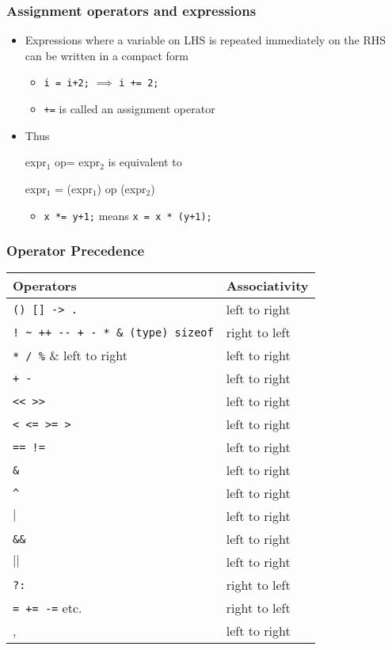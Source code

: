 \documentclass[11pt]{beamer}
\begin{document}
\begin{frame}[fragile]\frametitle{Assignment operators and expressions}
\label{sec-1-22}

\begin{itemize}
\item Expressions where a variable on LHS is repeated immediately on the RHS can be written in a compact form
\begin{itemize}
\item \verb~i = i+2;~ $\implies$ \verb~i += 2;~
\item \verb~+=~ is called an assignment operator
\end{itemize}
\item Thus

   expr$_1$ op= expr$_2$ is equivalent to
 
   expr$_1$ = (expr$_1$) op (expr$_2$)
\begin{itemize}
\item \verb~x *= y+1;~ means \verb~x = x * (y+1);~
\end{itemize}
\end{itemize}
\end{frame}
\begin{frame}[fragile]\frametitle{Operator Precedence}
\label{sec-1-23}



\begin{center}
\begin{tabular}{|p{7cm}|l|}
\hline
 Operators                               &  Associativity  \\
\hline
 \verb~() [] -> .~                       &  left to right  \\
 \verb,! ~ ++ -- + - * & (type) sizeof,  &  right to left  \\
 \verb~* / %~                            &  left to right  \\
 \verb~+ -~                              &  left to right  \\
 \verb~<< >>~                            &  left to right  \\
 \verb~< <= >= >~                        &  left to right  \\
 \verb~== !=~                            &  left to right  \\
 \verb~&~                                &  left to right  \\
 \verb~^~                                &  left to right  \\
 $\vert$                                 &  left to right  \\
 \verb~&&~                               &  left to right  \\
 $\vert\vert$                            &  left to right  \\
 \verb~?:~                               &  right to left  \\
 \verb~= += -=~ etc.                     &  right to left  \\
 ,                                       &  left to right  \\
\hline
\end{tabular}
\end{center}
\end{frame}
\end{document}

